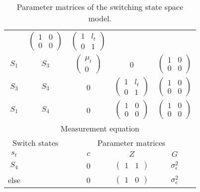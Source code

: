 \documentclass[11pt]{article}
\begin{document}
\begin{table}[h!]
\begin{tabular}[h!]{cc|ccc}
                                    & $\begin{pmatrix} 1 & 0 \\ 0 &
                                      0 \end{pmatrix}$ 
          & $\begin{pmatrix} 1 & l_t\\ 0 & 1 \end{pmatrix}$\\
  $S_1$ & $S_3$ & $\begin{pmatrix} \mu_t\\0\end{pmatrix}$ & 0
          & $\begin{pmatrix} 1 & 0\\ 0 & 0 \end{pmatrix}$\\
  $S_3$ & $S_3$ & 0& $\begin{pmatrix} 1 & l_t \\ 0 & 1 \end{pmatrix}$ 
        & $\begin{pmatrix}1&0\\0&0\end{pmatrix}$\\
  $S_1$ &  $S_4$ & 0 & $\begin{pmatrix}1&0\\0&0\end{pmatrix}$ 
        & $\begin{pmatrix}1&0\\0&0\end{pmatrix}$\\
  \hline\hline
  \multicolumn{5}{c}{Measurement equation}\\
  \hline
  \multicolumn{2}{c|}{Switch states} & \multicolumn{3}{c}{Parameter
                                      matrices}\\
  $s_t$ && $c$ & $Z$ & $G$\\
  \hline
  $S_4$ & & 0 & $\begin{pmatrix} 1 & 1 \end{pmatrix}$ &
                                                                  $\sigma^2_\epsilon$\\
  else && 0 & $\begin{pmatrix} 1 & 0 \end{pmatrix}$ &
                                                                  $\sigma^2_\epsilon$\\
  \hline\hline
\end{tabular}
\caption{Parameter matrices of the switching state space model.\label{tab:parmats}}
\end{table}
\end{document}

